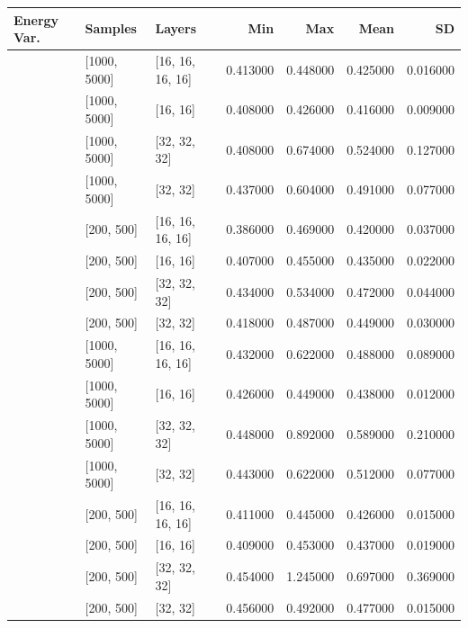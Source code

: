 \begin{tabular}{lllrrrr}
\toprule
Energy Var. & Samples & Layers & Min & Max & Mean & SD \\
\midrule
[0.001, 0.0001] & [1000, 5000] & [16, 16, 16, 16] & 0.413000 & 0.448000 & 0.425000 & 0.016000 \\
[0.001, 0.0001] & [1000, 5000] & [16, 16] & 0.408000 & 0.426000 & 0.416000 & 0.009000 \\
[0.001, 0.0001] & [1000, 5000] & [32, 32, 32] & 0.408000 & 0.674000 & 0.524000 & 0.127000 \\
[0.001, 0.0001] & [1000, 5000] & [32, 32] & 0.437000 & 0.604000 & 0.491000 & 0.077000 \\
[0.001, 0.0001] & [200, 500] & [16, 16, 16, 16] & 0.386000 & 0.469000 & 0.420000 & 0.037000 \\
[0.001, 0.0001] & [200, 500] & [16, 16] & 0.407000 & 0.455000 & 0.435000 & 0.022000 \\
[0.001, 0.0001] & [200, 500] & [32, 32, 32] & 0.434000 & 0.534000 & 0.472000 & 0.044000 \\
[0.001, 0.0001] & [200, 500] & [32, 32] & 0.418000 & 0.487000 & 0.449000 & 0.030000 \\
[0.1, 0.01] & [1000, 5000] & [16, 16, 16, 16] & 0.432000 & 0.622000 & 0.488000 & 0.089000 \\
[0.1, 0.01] & [1000, 5000] & [16, 16] & 0.426000 & 0.449000 & 0.438000 & 0.012000 \\
[0.1, 0.01] & [1000, 5000] & [32, 32, 32] & 0.448000 & 0.892000 & 0.589000 & 0.210000 \\
[0.1, 0.01] & [1000, 5000] & [32, 32] & 0.443000 & 0.622000 & 0.512000 & 0.077000 \\
[0.1, 0.01] & [200, 500] & [16, 16, 16, 16] & 0.411000 & 0.445000 & 0.426000 & 0.015000 \\
[0.1, 0.01] & [200, 500] & [16, 16] & 0.409000 & 0.453000 & 0.437000 & 0.019000 \\
[0.1, 0.01] & [200, 500] & [32, 32, 32] & 0.454000 & 1.245000 & 0.697000 & 0.369000 \\
[0.1, 0.01] & [200, 500] & [32, 32] & 0.456000 & 0.492000 & 0.477000 & 0.015000 \\
\bottomrule
\end{tabular}
